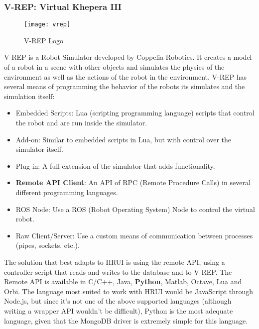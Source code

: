 \subsubsection{V-REP: Virtual Khepera III} \label{vrepvirtualkheperaiii}
\begin{figure}[H]
\centering
\texttt{[image: vrep]}
\caption{V-REP Logo}
\end{figure}
V-REP is a Robot Simulator developed by Coppelia Robotics. It creates a model of a robot in a scene with other objects and simulates the
physics of the environment as well as the actions of the robot in the environment. V-REP has several means of programming the behavior
of the robots its simulates and the simulation itself:
\begin{itemize}
  \item Embedded Scripts: Lua (scripting programming language) scripts that control the robot and are run inside the simulator.
  \item Add-on: Similar to embedded scripts in Lua, but with control over the simulator itself.
  \item Plug-in: A full extension of the simulator that adds functionality.
  \item \textbf{Remote API Client}: An API of RPC (Remote Procedure Calls) in several different programming languages.
  \item ROS Node: Use a ROS (Robot Operating System) Node to control the virtual robot.
  \item Raw Client/Server: Use a custom means of communication between processes (pipes, sockets, etc.).
\end{itemize}
The solution that best adapts to HRUI is using the remote API, using a controller script that reads and writes to the database and to 
V-REP. The Remote API is available in C/C++, Java, \textbf{Python}, Matlab, Octave, Lua and Orbi. The language most suited to work with
HRUI would be JavaScript through Node.js, but since it's not one of the above supported languages (although writing a wrapper API
wouldn't be difficult), Python is the most adequate language, given that the MongoDB driver is extremely simple for this language.\\

